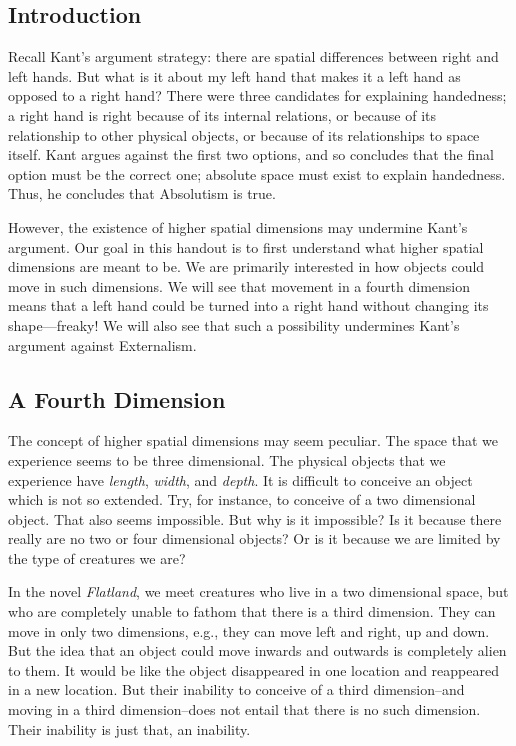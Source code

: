 \documentclass[oneside]{article}
\begin{document}
\thispagestyle{fancy}



\subsection*{Introduction}

Recall Kant's argument strategy: there are spatial differences between right and
left hands. But what is it about my left hand that makes it a
left hand as opposed to a right hand? There were three candidates for explaining handedness; a right hand is right because of its internal relations, or because of its relationship to other physical objects, or because of its relationships to space itself. Kant argues against the first two options, and so concludes that the final option must be the correct one; absolute space must exist to explain handedness. Thus, he concludes that Absolutism is true. 

However, the existence of higher spatial dimensions may undermine Kant's argument. Our goal in this handout is to first understand what higher spatial dimensions are meant to be. We are primarily interested in how objects could move in such dimensions. We will see that movement in a fourth dimension means that a left hand could be turned into a right hand without changing its shape---freaky! We will also see that such a possibility undermines Kant's argument against Externalism.

\subsection*{A Fourth Dimension}

The concept of higher spatial dimensions may seem peculiar. The space that we experience seems to be three dimensional. The physical objects that we experience have \emph{length}, \emph{width}, and \emph{depth}. It is difficult to conceive an object which is not so extended. Try, for instance, to conceive of a two dimensional object. That also seems impossible. But why is it impossible? Is it because there really are no two or four dimensional objects? Or is it because we are limited by the type of creatures we are? 

In the novel \emph{Flatland}, we meet creatures who live in a two dimensional space, but who are completely unable to fathom that there is a third dimension. They can move in only two dimensions, e.g., they can move left and right, up and down. But the idea that an object could move inwards and outwards is completely alien to them. It would be like the object disappeared in one location and reappeared in a new location. But their inability to conceive of a third dimension--and moving in a third dimension--does not entail that there is no such dimension. Their inability is just that, an inability. 
\end{document}
